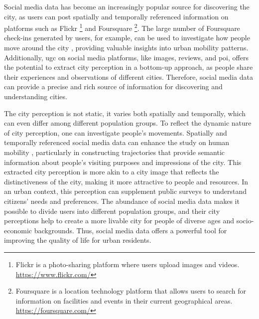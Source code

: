 \documentclass{article}
\begin{document}
Social media data has become an increasingly popular source for discovering the city, as users can post spatially and temporally referenced information on platforms such as Flickr \footnote{Flickr is a photo-sharing platform where users upload images and videos. \url{https://www.flickr.com/}} and Foursquare \footnote{Foursquare is a location technology platform that allows users to search for information on facilities and events in their current geographical areas. \url{https://foursquare.com/}}. The large number of Foursquare check-ins generated by users, for example, can be used to investigate how people move around the city \citep{ferreira_beyond_2015}, providing valuable insights into urban mobility patterns. Additionally, \acrfull{ugc} on social media platforms, like images, reviews, and \acrfull{poi}, offers the potential to extract city perception in a bottom-up approach, as people share their experiences and observations of different cities. Therefore, social media data can provide a precise and rich source of information for discovering and understanding cities.

The city perception is not static, it varies both spatially and temporally, which can even differ among different population groups. To reflect the dynamic nature of city perception, one can investigate people's movements. Spatially and temporally referenced social media data can enhance the study on human mobility \citep{beiro_predicting_2016}, particularly in constructing trajectories that provide semantic information about people's visiting purposes and impressions of the city. This extracted city perception is more akin to a city image that reflects the distinctiveness of the city, making it more attractive to people and resources. In an urban context, this perception can supplement public surveys to understand citizens’ needs and preferences. The abundance of social media data makes it possible to divide users into different population groups, and their city perceptions help to create a more livable city for people of diverse ages and socio-economic backgrounds. Thus, social media data offers a powerful tool for improving the quality of life for urban residents.
\end{document}
